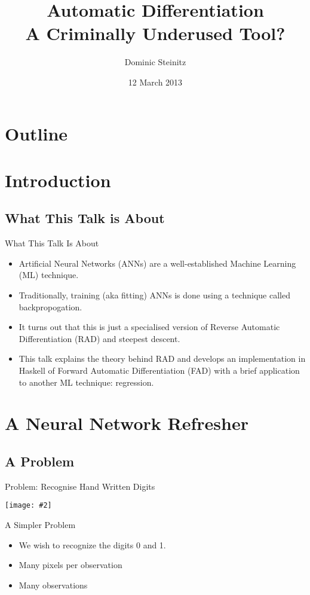 \documentclass{beamer}
\title[Automatic differentiation]{Automatic Differentiation\\A Criminally Underused Tool?}
\author{Dominic Steinitz}
\institute{Kingston University}
\date{12 March 2013}
\newcommand {\framedgraphic}[2] {
    \begin{frame}{#1}
        \begin{center}
            \texttt{[image: \#2]}
        \end{center}
    \end{frame}
}
\begin{document}
\begin{frame}
\titlepage
\end{frame}

\section*{Outline}
    \frame{\tableofcontents}

\section{Introduction}

\subsection{What This Talk is About}

\begin{frame}{What This Talk Is About}

  \begin{itemize}
  \item Artificial Neural Networks (ANNs) are a well-established
    Machine Learning (ML) technique.
  \item Traditionally, training (aka fitting) ANNs is done using a
    technique called backpropogation.
  \item It turns out that this is just a specialised version of
    Reverse Automatic Differentiation (RAD) and steepest descent.
  \item This talk explains the theory behind RAD and develops an
    implementation in Haskell of Forward Automatic Differentiation
    (FAD) with a brief application to another ML technique:
    regression.
  \end{itemize}

\end{frame}

\section{A Neural Network Refresher}

\subsection{A Problem}

\framedgraphic{Problem: Recognise Hand Written Digits}{diagrams/mnist_originals.png}

\begin{frame}[fragile]{A Simpler Problem}
\begin{itemize}
\item We wish to recognize the digits 0 and 1.
\item Many pixels per observation
\item Many observations
\end{itemize}
\end{frame}
\end{document}
